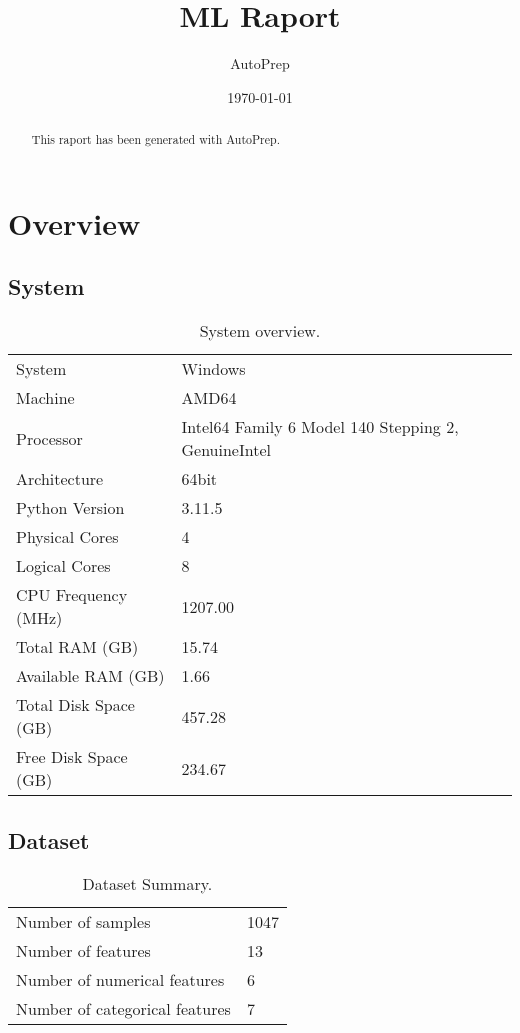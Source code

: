 \documentclass{article}%
\title{ML Raport}%
\author{AutoPrep}%
\date{\today}%
\begin{document}
%
\normalsize%
\maketitle%

    \begin{abstract}
    This raport has been generated with AutoPrep.
    \end{abstract}
\tableofcontents%
\newpage%
\section{Overview}%
\label{sec:Overview}%

%
\subsection{System}%
\label{subsec:System}%

%


\begin{table}[H]%
\begin{center}%
\begin{tabular}{l l}%
\hline%
System&Windows\\%
Machine&AMD64\\%
Processor&Intel64 Family 6 Model 140 Stepping 2, GenuineIntel\\%
Architecture&64bit\\%
Python Version&3.11.5\\%
Physical Cores&4\\%
Logical Cores&8\\%
CPU Frequency (MHz)&1207.00\\%
Total RAM (GB)&15.74\\%
Available RAM (GB)&1.66\\%
Total Disk Space (GB)&457.28\\%
Free Disk Space (GB)&234.67\\%
\hline%
\end{tabular}%
\end{center}%
\caption{System overview.}%
\end{table}

%
\subsection{Dataset}%
\label{subsec:Dataset}%

%


\begin{table}[H]%
\begin{center}%
\begin{tabular}{l l}%
\hline%
Number of samples&1047\\%
Number of features&13\\%
Number of numerical features&6\\%
Number of categorical features&7\\%
\hline%
\end{tabular}%
\end{center}%
\caption{Dataset Summary.}%
\end{table}
\end{document}
